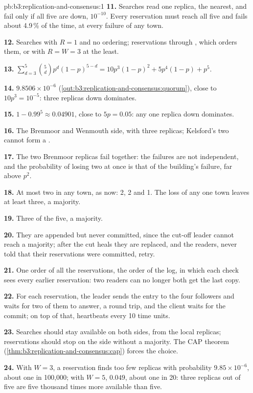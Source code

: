 \begin{solution}{pb:b3:replication-and-consensus:1}
\textbf{11.} Searches read one replica, the nearest, and fail only if all five are down, $10^{-10}$. Every reservation must reach all five and fails about 4.9\,\% of the time, at every failure of any town.

\textbf{12.} Searches with $R = 1$ and no ordering; reservations through , which orders them, or  with $R = W = 3$ at the least.

\textbf{13.} $\sum_{d=3}^{5} \binom{5}{d} p^d (1 - p)^{5 - d} = 10p^3(1 - p)^2 + 5p^4(1 - p) + p^5$.

\textbf{14.} $9.8506 \times 10^{-6}$ (\cref{out:b3:replication-and-consensus:quorum}), close to $10p^3 = 10^{-5}$: three replicas down dominates.

\textbf{15.} $1 - 0.99^5 \approx 0.04901$, close to $5p = 0.05$: any one replica down dominates.

\textbf{16.} The Brenmoor and Wenmouth side, with three replicas; Kelsford's two cannot form a .

\textbf{17.} The two Brenmoor replicas fail together: the failures are not independent, and the probability of losing two at once is that of the building's failure, far above $p^2$.

\textbf{18.} At most two in any town, as now: 2, 2 and 1. The loss of any one town leaves at least three, a majority.

\textbf{19.} Three of the five, a majority.

\textbf{20.} They are appended but never committed, since the cut-off leader cannot reach a majority; after the cut heals they are replaced, and the readers, never told that their reservations were committed, retry.

\textbf{21.} One order of all the reservations, the order of the log, in which each check sees every earlier reservation: two readers can no longer both get the last copy.

\textbf{22.} For each reservation, the leader sends the entry to the four followers and waits for two of them to answer, a round trip, and the client waits for the commit; on top of that, heartbeats every 10 time units.

\textbf{23.} Searches should stay available on both sides, from the local replicas; reservations should stop on the side without a majority. The CAP theorem (\cref{thm:b3:replication-and-consensus:cap}) forces the choice.

\textbf{24.} With $W = 3$, a reservation finds too few replicas with probability $9.85 \times 10^{-6}$, about one in 100,000; with $W = 5$, $0.049$, about one in 20: three replicas out of five are five thousand times more available than five.
\end{solution}
